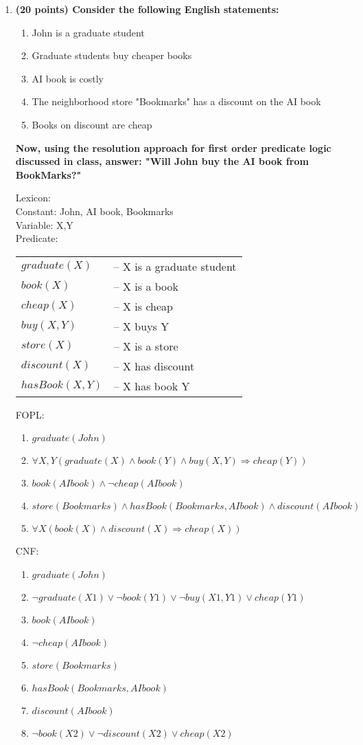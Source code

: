 \documentclass{article}%
\begin{document}
\begin{enumerate}
\item \textbf{(20 points) Consider the following English statements:}
	\begin{enumerate}
	\item John is a graduate student
	\item Graduate students buy cheaper books
	\item AI book is costly
	\item The neighborhood store "Bookmarks" has a discount on the AI book
	\item Books on discount are cheap
	\end{enumerate}

\textbf{Now, using the resolution approach for first order predicate logic discussed in class, answer: "Will John buy the AI book from BookMarks?"}

Lexicon: \\
Constant: John, AI book, Bookmarks \\
Variable: X,Y\\
Predicate: \\
\begin{tabular}{p{2.5cm}l}
 $graduate(X)$ & -- X is a graduate student \\ 
 $book(X)$ & -- X is a book  \\
 $cheap(X)$ & -- X is cheap  \\
$ buy(X,Y)$ & -- X buys Y \\
 $store(X)$ & -- X is a store  \\ 
 $discount(X)$ & -- X has discount  \\ 
 $ hasBook(X,Y) $ & -- X has book Y
\end{tabular} 

FOPL:
\begin{enumerate}
\item $ graduate(John) $
\item $ \forall X, Y (graduate(X) \wedge book(Y) \wedge buy(X,Y)   \Rightarrow cheap(Y)) $
\item $ book(AI book) \wedge \neg cheap(AI book) $
\item $ store(Bookmarks) \wedge hasBook(Bookmarks, AI book) \wedge discount(AI book) $
\item $ \forall X (book(X) \wedge discount(X) \Rightarrow cheap(X)) $
\end{enumerate}

CNF:
\begin{enumerate}
\item $ graduate(John) $
\item $ \neg graduate(X1) \vee \neg book(Y1) \vee \neg buy(X1,Y1)  \vee  cheap(Y1)$
\item $ book(AI book) $
\item $ \neg cheap(AI book) $
\item $ store(Bookmarks) $
\item $ hasBook(Bookmarks, AI book) $
\item $ discount(AI book) $
\item $ \neg book(X2) \vee \neg discount(X2) \vee cheap(X2) $
\end{enumerate}


\end{enumerate}
\end{document}
